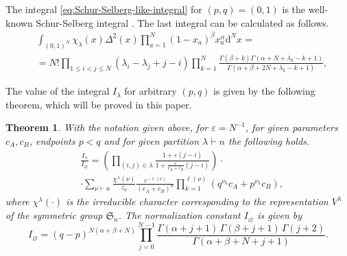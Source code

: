 \documentclass{article}
\newcommand{\dif}{\mathrm{d}}
\theoremstyle{plain}
\newtheorem{thm}{Theorem}[section]
\theoremstyle{definition}
\numberwithin{equation}{section}
\begin{document}
The integral \eqref{eq:Schur-Selberg-like-integral} for $(p,q) = (0,1)$ is the well-known Schur-Selberg integral \cite[page 385]{macdonald1995symmetric}. The last integral can be calculated as follows.
\begin{equation}
    \label{eq:01-schur-selberg}
    \begin{aligned}
        & \int_{(0,1)^{N}} \chi_{\lambda}(x) \Delta^{2}(x)\prod_{a=1}^{N}(1-x_{a})^{\beta} x_{a}^{\alpha} \dif^{N}x = \\
        & = N!\prod_{1 \leq i<j \leq N}\left(\lambda_i-\lambda_j+j-i\right) \prod_{k=1}^N \frac{\Gamma(\beta+k) \Gamma\left(\alpha+N+\lambda_k-k+1\right)}{\Gamma\left(\alpha+\beta+2 N+\lambda_k-k+1\right)},
    \end{aligned}
\end{equation}

The value of the integral $I_\lambda$ for arbitrary $(p,q)$ is given by the following theorem, which will be proved in this paper.

\begin{thm}
    \label{thm:schur-selberg}
    With the notation given above, for $\varepsilon = N^{-1}$, for given parameters $c_A,c_B$, endpoints $p < q$ and for given partition $\lambda \vdash n$ the following holds.
    \begin{equation}
        \label{eq:theorem_schur-selberg-type}
        \begin{aligned}
            &\frac{I_\lambda}{I_{\varnothing}}  = \left(\prod_{(i,j) \in \lambda} \frac{1+ \varepsilon (j-i)}{1+ \frac{\varepsilon}{c_{A}+c_{B}} (j-i)}\right) \cdot \\
            & \cdot \sum\limits_{\nu \vdash n} \frac{\chi^{\lambda}(\nu)}{z_{\nu}} \frac{\varepsilon^{-\ell(\nu)}}{(c_{A}+c_{B})^n}\prod_{k=1}^{\ell(\nu)} (q^{\nu_{k}} c_{A}+ p^{\nu_{k}}c_B),
        \end{aligned}
    \end{equation}
    where $\chi^{\lambda}(\cdot)$ is the irreducible character corresponding to the representation $V^\lambda$ of the symmetric group $\mathfrak{S}_n$.
    The normalization constant $I_\varnothing$ is given by
    \begin{equation}
        I_{\varnothing} = (q-p)^{N(\alpha+\beta+N)} \prod_{j=0}^{N-1} \frac{\Gamma(\alpha+j+1)\, \Gamma(\beta+j+1)\, \Gamma(j+2)}{\Gamma(\alpha+\beta+N+j+1)}.
    \end{equation}
\end{thm}
\end{document}
